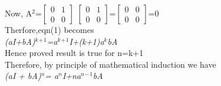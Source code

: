 \documentclass[a4paper,12pt]{article}
\begin{document}
Now,
A$^2$=$\begin{bmatrix} 0 & 1  \\ 0 & 0 \end{bmatrix}$ $\begin{bmatrix} 0 & 1  \\ 0 & 0 \end{bmatrix}$=$\begin{bmatrix} 0 & 0  \\ 0 & 0 \end{bmatrix}$=0\\

Therfore,eqn(1) becomes\\
\textit{(aI+bA)$^k$$^+$$^1$=a$^k$$^+$$^1$I+(k+1)a$^k$bA}\\

Hence proved result is true for n=k+1\\

Therefore, by principle of mathematical induction we have\\
\textit{(aI + bA)$^n$= a$^n$I+na$^n$$^-$$^1$bA}\\
\end{document}
